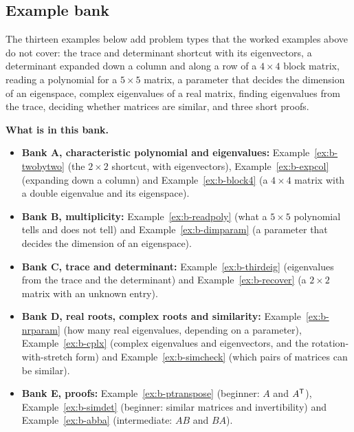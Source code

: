 \documentclass[11pt]{article}
\begin{document}
\subsection*{Example bank}
The thirteen examples below add problem types that the worked examples above do not cover: the trace and determinant shortcut with its eigenvectors, a determinant expanded down a column and along a row of a $4\times4$ block matrix, reading a polynomial for a $5\times5$ matrix, a parameter that decides the dimension of an eigenspace, complex eigenvalues of a real matrix, finding eigenvalues from the trace, deciding whether matrices are similar, and three short proofs.

\textbf{What is in this bank.}
\begin{itemize}
  \item \textbf{Bank A, characteristic polynomial and eigenvalues:} Example~\ref{ex:b-twobytwo} (the $2\times2$ shortcut, with eigenvectors), Example~\ref{ex:b-expcol} (expanding down a column) and Example~\ref{ex:b-block4} (a $4\times4$ matrix with a double eigenvalue and its eigenspace).
  \item \textbf{Bank B, multiplicity:} Example~\ref{ex:b-readpoly} (what a $5\times5$ polynomial tells and does not tell) and Example~\ref{ex:b-dimparam} (a parameter that decides the dimension of an eigenspace).
  \item \textbf{Bank C, trace and determinant:} Example~\ref{ex:b-thirdeig} (eigenvalues from the trace and the determinant) and Example~\ref{ex:b-recover} (a $2\times2$ matrix with an unknown entry).
  \item \textbf{Bank D, real roots, complex roots and similarity:} Example~\ref{ex:b-nrparam} (how many real eigenvalues, depending on a parameter), Example~\ref{ex:b-cplx} (complex eigenvalues and eigenvectors, and the rotation-with-stretch form) and Example~\ref{ex:b-simcheck} (which pairs of matrices can be similar).
  \item \textbf{Bank E, proofs:} Example~\ref{ex:b-ptranspose} (beginner: $A$ and $A^{\mathsf T}$), Example~\ref{ex:b-simdet} (beginner: similar matrices and invertibility) and Example~\ref{ex:b-abba} (intermediate: $AB$ and $BA$).
\end{itemize}
\end{document}
